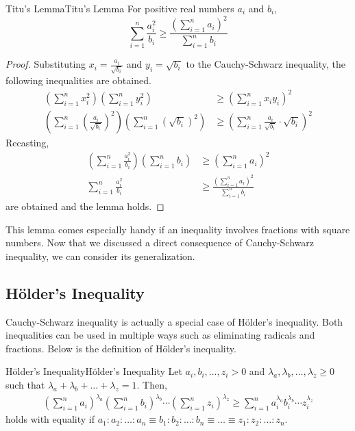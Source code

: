 \documentclass[../../../main.tex]{subfiles}
\begin{document}
\begin{corollary}{Titu's Lemma}{Titu's Lemma}
For positive real numbers $a_i$ and $b_i$,
\[
\sum_{i=1}^n \frac{a_i^2}{b_i}
\geq
\frac{ \left( \sum_{i=1}^n a_i \right)^2 }{ \sum_{i=1}^n b_i }
\]
\end{corollary}
\begin{proof}
Substituting $x_i = \frac{a_i}{\sqrt{b_i}}$ and $y_i = \sqrt{b_i}$
to the Cauchy-Schwarz inequality, the following inequalities are
obtained.
\begin{align*}
    \left( \sum_{i=1}^n x_i^2 \right)
    \left( \sum_{i=1}^n y_i^2 \right)
    &\geq
    \left( \sum_{i=1}^n x_i y_i \right)^2 \\[0.5em]
    \left(
        \sum_{i=1}^n \left( \frac{a_i}{\sqrt{b_i}} \right)^2
    \right)
    \left(
        \sum_{i=1}^n \left( \sqrt{b_i} \right)^2
    \right)
    &\geq
    \left(
        \sum_{i=1}^n \frac{a_i}{\sqrt{b_i}} \cdot \sqrt{b_i}
    \right)^2
\end{align*}
Recasting,
\begin{align*}
    \left( \sum_{i=1}^n \frac{a_i^2}{b_i} \right)
        \left( \sum_{i=1}^n b_i \right)
    &\geq
    \left( \sum_{i=1}^n a_i \right)^2 \\
    \sum_{i=1}^n \frac{a_i^2}{b_i}
    &\geq
    \frac{ \left( \sum_{i=1}^n a_i \right)^2 }{ \sum_{i=1}^n b_i }
\end{align*}
are obtained and the lemma holds.
\end{proof}

This lemma comes especially handy if an inequality involves
fractions with square numbers. Now that we discussed a direct
consequence of Cauchy-Schwarz inequality, we can consider its
generalization.

\subsection{Hölder's Inequality}

Cauchy-Schwarz inequality is actually a special case of Hölder's
inequality. Both inequalities can be used in multiple ways such as
eliminating radicals and fractions. Below is the definition of
Hölder's inequality.

\begin{definition}{Hölder's Inequality}{Hölder's Inequality}
Let $a_i, b_i, \ldots, z_i > 0$ and $\lambda_a, \lambda_b, \ldots,
\lambda_z \geq 0$ such that $\lambda_a + \lambda_b + \dots +
\lambda_z = 1$. Then,
\begin{align*}
\left( \sum_{i=1}^n a_i \right)^{\lambda_a}
\left( \sum_{i=1}^n b_i \right)^{\lambda_b} \cdots
\left( \sum_{i=1}^n z_i \right)^{\lambda_z}
\geq
    \sum_{i=1}^n a_i^{\lambda_a} b_i^{\lambda_b}
        \cdots z_i^{\lambda_z}
\end{align*}
holds with equality if $a_1 : a_2 : \dots : a_n \equiv b_1 : b_2 :
\dots : b_n \equiv \dots \equiv z_1 : z_2 : \dots : z_n$.
\end{definition}
\end{document}
